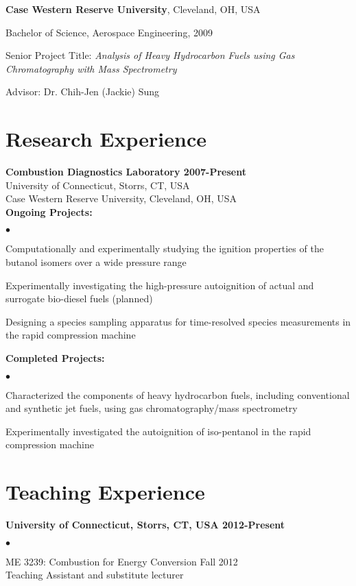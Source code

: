 \documentclass[margin,line]{res}
\newenvironment{list1}{
  \begin{list}{\ding{113}}{%
      \setlength{\itemsep}{0in}
      \setlength{\parsep}{0in} \setlength{\parskip}{0in}
      \setlength{\topsep}{0in} \setlength{\partopsep}{0in} 
      \setlength{\leftmargin}{0.17in}}}{\end{list}}
\newenvironment{list2}{
  \begin{list}{$\bullet$}{%
      \setlength{\itemsep}{0.05in}
      \setlength{\parsep}{0in} \setlength{\parskip}{0in}
      \setlength{\topsep}{0in} \setlength{\partopsep}{0in} 
      \setlength{\leftmargin}{0.2in}}}{\end{list}}
\begin{document}
\begin{resume}
{\bf Case Western Reserve University}, Cleveland, OH, USA
\begin{list1}
\item[] Bachelor of Science, Aerospace Engineering, 2009
\item[] Senior Project Title: \emph{Analysis of Heavy Hydrocarbon Fuels using Gas Chromatography with Mass Spectrometry}
\item[] Advisor: Dr. Chih-Jen (Jackie) Sung
\end{list1}

\section{\sc Research Experience}
{\bf \large{Combustion Diagnostics Laboratory \hfill 2007-Present}}\\
University of Connecticut, Storrs, CT, USA\\
Case Western Reserve University, Cleveland, OH, USA\\
{\bf Ongoing Projects:}
\begin{list2}
\item Computationally and experimentally studying the ignition properties of the butanol isomers over a wide pressure range
\item Experimentally investigating the high-pressure autoignition of actual and surrogate bio-diesel fuels (planned)
\item Designing a species sampling apparatus for time-resolved species measurements in the rapid compression machine
\end{list2}
{\bf Completed Projects:}
\begin{list2}
\item Characterized the components of heavy hydrocarbon fuels, including conventional and synthetic jet fuels, using gas chromatography/mass spectrometry
\item Experimentally investigated the autoignition of iso-pentanol in the rapid compression machine
\end{list2}

\section{\sc Teaching Experience}
{\bf \large{University of Connecticut, Storrs, CT, USA} \hfill 2012-Present}\\
\begin{list2}
\item ME 3239: Combustion for Energy Conversion \hfill Fall 2012\\
Teaching Assistant and substitute lecturer
\end{list2}


\end{resume}
\end{document}
